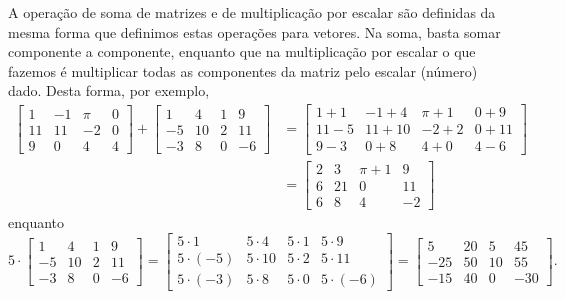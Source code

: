 A operação de soma de matrizes e de multiplicação por escalar são definidas da mesma forma que definimos estas operações para vetores. Na soma, basta somar componente a componente, enquanto que na multiplicação por escalar o que fazemos é multiplicar todas as componentes da matriz pelo escalar (número) dado. Desta forma, por exemplo,
\begin{align*}
\left[
\begin{array}{cccc}
1 & -1 & \pi & 0 \\
11 & 11 & -2 & 0 \\
9 & 0 & 4 & 4 
\end{array}
\right] +
\left[
\begin{array}{cccc}
1 & 4 & 1 & 9 \\
-5 & 10 & 2 & 11 \\
-3 & 8 & 0 & -6 
\end{array}
\right] & =
\left[
\begin{array}{cccc}
1+1 & -1 +4 & \pi + 1 & 0+ 9 \\
11-5 & 11+10 & -2+2 & 0+11 \\
9-3 & 0+8 & 4+0 & 4-6 
\end{array}
\right] \\
& =
\left[
\begin{array}{cccc}
2 & 3 & \pi + 1 & 9 \\
6 & 21 & 0 & 11 \\
6 & 8 & 4 & -2 
\end{array}
\right]
\end{align*}
enquanto
\begin{equation}
5\cdot \left[
\begin{array}{cccc}
1 & 4 & 1 & 9 \\
-5 & 10 & 2 & 11 \\
-3 & 8 & 0 & -6 
\end{array}
\right] =
\left[
\begin{array}{cccc}
5\cdot 1 & 5\cdot 4 & 5\cdot 1 & 5\cdot 9 \\
5\cdot (-5) & 5\cdot 10 & 5\cdot 2 & 5\cdot 11 \\
5\cdot (-3) & 5\cdot 8 & 5\cdot 0 & 5\cdot (-6) 
\end{array}
\right] =
\left[
\begin{array}{cccc}
5 & 20 & 5 & 45 \\
-25 & 50 & 10 & 55 \\
-15 & 40 & 0 & -30
\end{array}
\right].
\end{equation}


